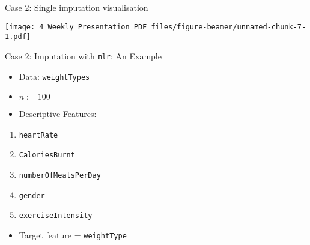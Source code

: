 \documentclass[ignorenonframetext,]{beamer}
\providecommand{\tightlist}{%
  \setlength{\itemsep}{0pt}\setlength{\parskip}{0pt}}
\begin{document}
\begin{frame}{Case 2: Single imputation visualisation}

\texttt{[image: 4\_Weekly\_Presentation\_PDF\_files/figure-beamer/unnamed-chunk-7-1.pdf]}

\end{frame}

\begin{frame}[fragile]{Case 2: Imputation with \texttt{mlr}: An Example}

\begin{itemize}
\tightlist
\item
  Data: \texttt{weightTypes}
\item
  \(n:=100\)
\item
  Descriptive Features:
\end{itemize}

\begin{enumerate}
\def\labelenumi{\arabic{enumi}.}
\tightlist
\item
  \texttt{heartRate}
\item
  \texttt{CaloriesBurnt}
\item
  \texttt{numberOfMealsPerDay}
\item
  \texttt{gender}
\item
  \texttt{exerciseIntensity}
\end{enumerate}

\begin{itemize}
\tightlist
\item
  Target feature = \texttt{weightType}
\end{itemize}

\end{frame}
\end{document}

